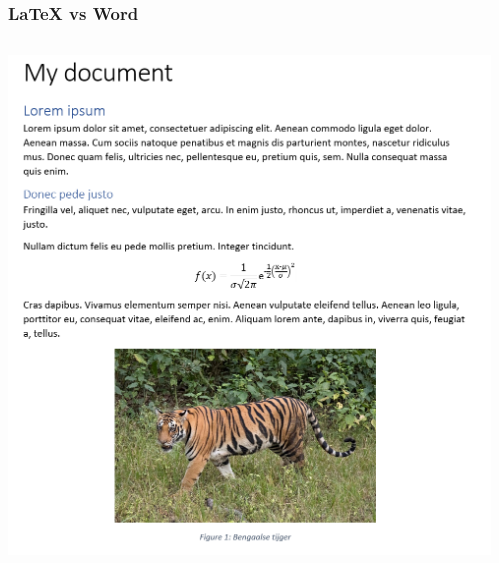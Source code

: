 \documentclass[presentatie.tex]{subfiles}
\def\named#1{}
\begin{document}
    \clearrecentlist

    \named{intro-wordcomp-doc}
    \begin{frame}
        \frametitle{\LaTeX{} vs Word}

        \begin{columns}
            \begin{column}{0.5\textwidth}
                \includegraphics[width=\linewidth,height=0.8\textheight,keepaspectratio]{assets/basicDocWordSnippet.png}
            \end{column}
            \begin{column}{0.5\textwidth}

\end{column}
\end{columns}
\end{frame}
\end{document}
